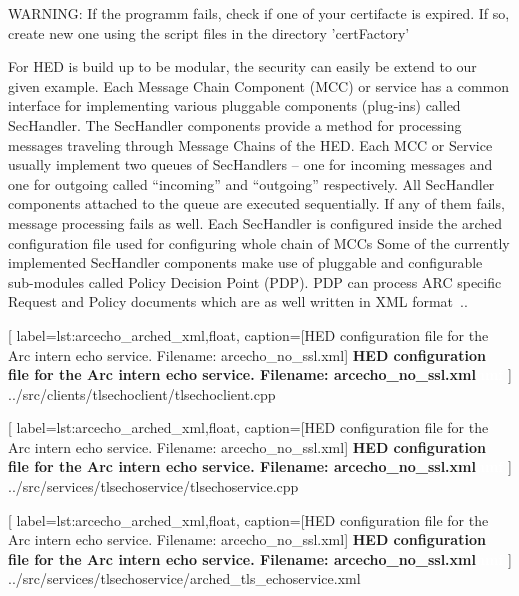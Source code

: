 WARNING: If the programm fails, check if one of your certifacte is expired. If so, create new one using the script files in the directory 'certFactory'

For HED is build up to  %
be modular, the security can easily be extend to our given example.
Each Message Chain Component (MCC) or service has a common interface for implementing various pluggable components (plug-ins) called SecHandler. The SecHandler components provide a method for processing messages traveling through Message Chains of the HED. 
Each MCC or Service usually implement two queues of SecHandlers – one for incoming messages and one for outgoing called “incoming” and “outgoing” respectively. All SecHandler components attached to the queue are executed sequentially. 
If any of them fails, message processing fails as well. 
Each SecHandler is configured inside the arched configuration file used for configuring whole chain of MCCs 
Some of the currently implemented SecHandler components make use of pluggable and configurable sub-modules called Policy Decision Point (PDP). PDP can process ARC specific Request and Policy documents which are as well written in XML format~\cite{QIANG_2008}..




	[
	label=lst:arcecho_arched_xml,float,
	caption={[HED configuration file for the Arc intern echo service. Filename: arcecho\_no\_ssl.xml]
	\textbf{HED configuration file for the Arc intern echo service. Filename: arcecho\_no\_ssl.xml\textcolor{white}{hmf}}}
	]
{../src/clients/tlsechoclient/tlsechoclient.cpp}




	[
	label=lst:arcecho_arched_xml,float,
	caption={[HED configuration file for the Arc intern echo service. Filename: arcecho\_no\_ssl.xml]
	\textbf{HED configuration file for the Arc intern echo service. Filename: arcecho\_no\_ssl.xml\textcolor{white}{hmf}}}
	]
{../src/services/tlsechoservice/tlsechoservice.cpp}





	[
	label=lst:arcecho_arched_xml,float,
	caption={[HED configuration file for the Arc intern echo service. Filename: arcecho\_no\_ssl.xml]
	\textbf{HED configuration file for the Arc intern echo service. Filename: arcecho\_no\_ssl.xml\textcolor{white}{hmf}}}
	]
{../src/services/tlsechoservice/arched_tls_echoservice.xml}



